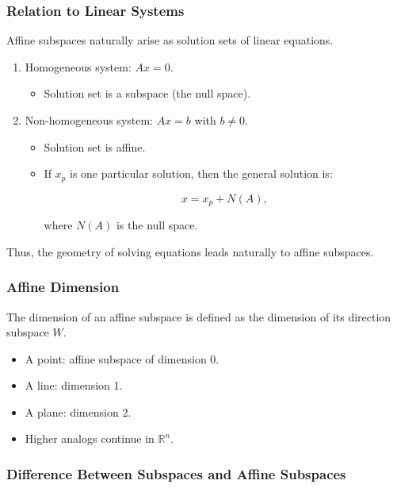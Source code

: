\documentclass[
  letterpaper,
  DIV=11,
  numbers=noendperiod]{scrreprt}
\providecommand{\tightlist}{%
  \setlength{\itemsep}{0pt}\setlength{\parskip}{0pt}}
\begin{document}
\subsubsection{Relation to Linear
Systems}\label{relation-to-linear-systems}

Affine subspaces naturally arise as solution sets of linear equations.

\begin{enumerate}
\def\labelenumi{\arabic{enumi}.}
\item
  Homogeneous system: \(Ax = 0\).

  \begin{itemize}
  \tightlist
  \item
    Solution set is a subspace (the null space).
  \end{itemize}
\item
  Non-homogeneous system: \(Ax = b\) with \(b \neq 0\).

  \begin{itemize}
  \item
    Solution set is affine.
  \item
    If \(x_p\) is one particular solution, then the general solution is:

    \[
    x = x_p + N(A),
    \]

    where \(N(A)\) is the null space.
  \end{itemize}
\end{enumerate}

Thus, the geometry of solving equations leads naturally to affine
subspaces.

\subsubsection{Affine Dimension}\label{affine-dimension}

The dimension of an affine subspace is defined as the dimension of its
direction subspace \(W\).

\begin{itemize}
\tightlist
\item
  A point: affine subspace of dimension 0.
\item
  A line: dimension 1.
\item
  A plane: dimension 2.
\item
  Higher analogs continue in \(\mathbb{R}^n\).
\end{itemize}

\subsubsection{Difference Between Subspaces and Affine
Subspaces}\label{difference-between-subspaces-and-affine-subspaces}
\end{document}
